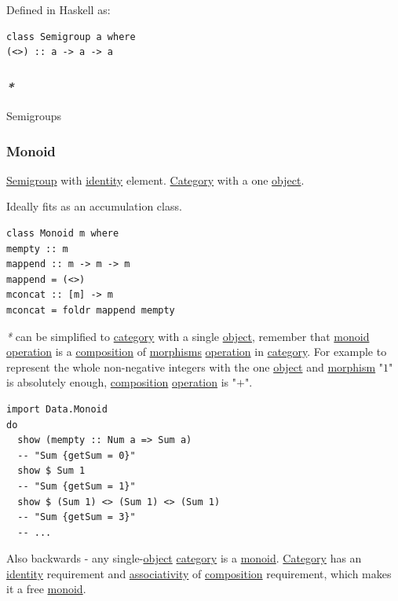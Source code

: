 \documentclass[a4paper,14pt,oneside]{book}
\begin{document}
Defined in Haskell as:
\begin{verbatim}
class Semigroup a where
(<>) :: a -> a -> a
\end{verbatim}

\subsubsection{\emph{*}}
\label{sec:org471762d}

\label{orgc24b9f0}Semigroups

\subsubsection{\label{orge939cab}Monoid}
\label{sec:orge4ffc53}
\hyperref[org222773c]{Semigroup} with \hyperref[org295ca20]{identity} element. \hyperref[org770b3fc]{Category} with a one \hyperref[orga8f9422]{object}.

Ideally fits as an accumulation class.

\begin{verbatim}
class Monoid m where
mempty :: m
mappend :: m -> m -> m
mappend = (<>)
mconcat :: [m] -> m
mconcat = foldr mappend mempty
\end{verbatim}

\emph{*} can be simplified to \hyperref[org770b3fc]{category} with a single \hyperref[orga8f9422]{object}, remember that \hyperref[orge939cab]{monoid} \hyperref[org9336947]{operation} is a \hyperref[orgd50f9f3]{composition} of \hyperref[orgf894ccc]{morphisms} \hyperref[org9336947]{operation} in \hyperref[org770b3fc]{category}.
For example to represent the whole non-negative integers with the one \hyperref[orga8f9422]{object} and \hyperref[org4b83b1e]{morphism} "\(1\)" is absolutely enough, \hyperref[orgd50f9f3]{composition} \hyperref[org9336947]{operation} is "\(+\)".

\begin{verbatim}
import Data.Monoid
do
  show (mempty :: Num a => Sum a)
  -- "Sum {getSum = 0}"
  show $ Sum 1
  -- "Sum {getSum = 1}"
  show $ (Sum 1) <> (Sum 1) <> (Sum 1)
  -- "Sum {getSum = 3}"
  -- ...
\end{verbatim}

Also backwards - any single-\hyperref[orga8f9422]{object} \hyperref[org770b3fc]{category} is a \hyperref[orge939cab]{monoid}. \hyperref[org770b3fc]{Category} has an \hyperref[org295ca20]{identity} requirement and \hyperref[orgfb8efe5]{associativity} of \hyperref[orgd50f9f3]{composition} requirement, which makes it a free \hyperref[orge939cab]{monoid}. 
\end{document}
